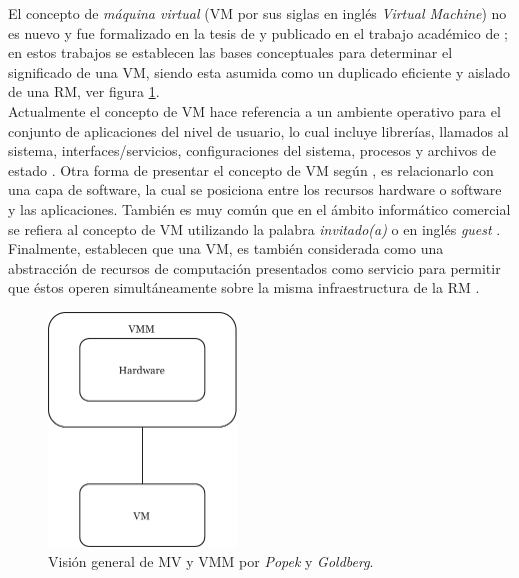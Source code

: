 El concepto de \textit{máquina virtual} (VM por sus siglas en inglés \textit{Virtual Machine}) no es nuevo y fue formalizado en la tesis de  \textcite{Goldberg1973} y publicado en el trabajo académico de \textcite{Goldberg1974}; en estos trabajos se establecen las bases conceptuales para determinar el significado de una VM, siendo esta asumida como un duplicado eficiente y aislado de una RM, ver figura \ref{fig:TheVirtualMachineMonitor_Popek1974}.\\

Actualmente el concepto de VM hace referencia a un ambiente operativo para el conjunto de aplicaciones del nivel de usuario, lo cual incluye librerías, llamados al sistema, interfaces/servicios, configuraciones del sistema, procesos y archivos de estado \parencite{Chiueh2005}. Otra forma de presentar el concepto de VM según \textcite{Solis2014}, es relacionarlo con una capa de software, la cual se posiciona entre los recursos hardware o software y las aplicaciones. También es muy común que en el ámbito informático comercial se refiera al concepto de VM utilizando la palabra \textit{invitado(a)} o en inglés \textit{guest} \parencite{VMware2008}. Finalmente, \textcite{Pek2013} establecen que una VM, es también considerada como una abstracción de recursos de computación presentados como servicio para permitir que éstos operen simultáneamente sobre la misma infraestructura de la RM .

\begin{figure}[!hbtp]
	\centering
	\includegraphics[width=5cm]{Pictures/VMMPopek1974.pdf}
	\vspace{-0.2cm}
	\caption{Visión general de MV y VMM por \textit{Popek} y \textit{Goldberg}.\footnotemark[2]{} }
	\label{fig:TheVirtualMachineMonitor_Popek1974}
\end{figure}


